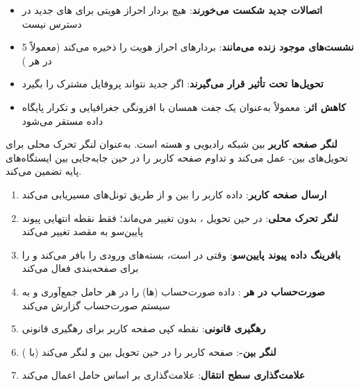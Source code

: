 
\begin{itemize}
\tightlist
\item
  \textbf{اتصالات جدید شکست می‌خورند}: هیچ بردار احراز هویتی برای های جدید در دسترس نیست
\item
  \textbf{نشست‌های موجود زنده می‌مانند}:  بردارهای احراز هویت را ذخیره می‌کند (معمولاً 5 در هر )
\item
  \textbf{تحویل‌ها تحت تأثیر قرار می‌گیرند}: اگر  جدید نتواند پروفایل مشترک را بگیرد
\item
  \textbf{کاهش اثر}:  معمولاً به‌عنوان یک جفت همسان با افزونگی جغرافیایی و تکرار پایگاه داده مستقر می‌شود
\end{itemize}



\CNchained{}

 \textbf{لنگر صفحه کاربر} بین شبکه رادیویی و هسته است. به‌عنوان لنگر تحرک محلی برای تحویل‌های بین- عمل می‌کند و تداوم صفحه کاربر را در حین جابه‌جایی  بین ایستگاه‌های پایه تضمین می‌کند.


\begin{enumerate}
\def\labelenumi{\arabic{enumi}.}
\tightlist
\item
  \textbf{ارسال صفحه کاربر}: داده کاربر را بین  و  از طریق تونل‌های  مسیریابی می‌کند
\item
  \textbf{لنگر تحرک محلی}: در حین تحویل ،  بدون تغییر می‌ماند؛ فقط نقطه انتهایی  پیوند پایین‌سو به  مقصد تغییر می‌کند
\item
  \textbf{بافرینگ داده پیوند پایین‌سو}: وقتی  در  است،  بسته‌های ورودی را بافر می‌کند و  را برای صفحه‌بندی  فعال می‌کند
\item
  \textbf{صورت‌حساب در هر }: داده صورت‌حساب (ها) را در هر حامل جمع‌آوری و به سیستم صورت‌حساب گزارش می‌کند
\item
  \textbf{رهگیری قانونی}: نقطه کپی صفحه کاربر برای رهگیری قانونی
\item
  \textbf{لنگر بین-}: صفحه کاربر را در حین تحویل بین  و  لنگر می‌کند (با )
\item
  \textbf{علامت‌گذاری سطح انتقال}: علامت‌گذاری  بر اساس  حامل اعمال می‌کند
\end{enumerate}

